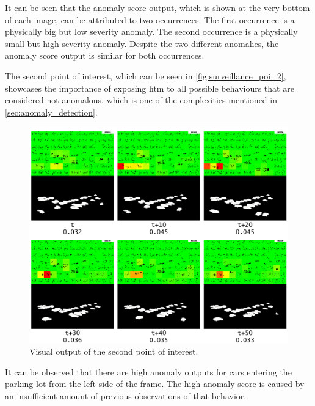 It can be seen that the anomaly score output, which is shown at the very bottom of each image, can be attributed to two occurrences. The first occurrence is a physically big but low severity anomaly. The second occurrence is a physically small but high severity anomaly. Despite the two different anomalies, the anomaly score output is similar for both occurrences.
\par
The second point of interest, which can be seen in \autoref{fig:surveillance_poi_2}, showcases the importance of exposing \gls*{htm} to all possible behaviours that are considered not anomalous, which is one of the complexities mentioned in \autoref{sec:anomaly_detection}.
\begin{figure}[H]
    \centering
    \includegraphics[width=\textwidth]{resources/experiments/surveillance/surveillance_poi_2.png}
    \caption[Second POI]{Visual output of the second point of interest.}
    \label{fig:surveillance_poi_2}
\end{figure}
It can be observed that there are high anomaly outputs for cars entering the parking lot from the left side of the frame. The high anomaly score is caused by an insufficient amount of previous observations of that behavior.
